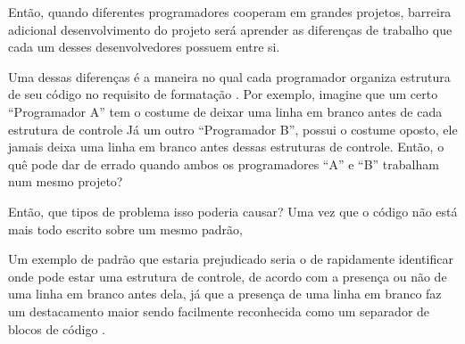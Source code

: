 {    Então,
    quando diferentes programadores cooperam em grandes projetos,
      barreira adicional  desenvolvimento do projeto será aprender as diferenças de trabalho que cada um desses desenvolvedores possuem entre si.

    Uma dessas diferenças é a maneira no qual cada programador organiza estrutura de seu código no requisito de formatação \cite{transformationForDomainSpecificOptimisation}.
    Por exemplo,
    imagine que um certo ``Programador A'' tem o costume de deixar uma linha em branco antes de cada estrutura de controle Já um outro ``Programador B'',
    possui o costume oposto,
    ele jamais deixa uma linha em branco antes dessas estruturas de controle.
    Então,
    o quê pode dar de errado quando ambos os programadores ``A'' e
    ``B'' trabalham num mesmo projeto?

     Então,
    que tipos de problema isso poderia causar?
    Uma vez que o código não está mais todo escrito sobre um mesmo padrão,

    Um exemplo de padrão que estaria prejudicado seria o de rapidamente identificar onde pode estar uma estrutura de controle, de acordo com a presença ou
    não de uma linha em branco antes dela,
    já que a presença de uma linha em branco faz um destacamento maior sendo facilmente reconhecida como um separador de blocos de código \cite{aPrettyGoodFormatting}.
}

